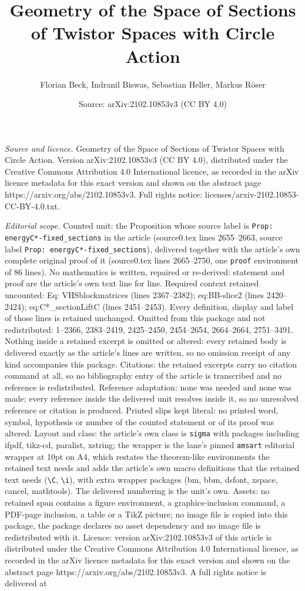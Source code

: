 \documentclass[10pt,a4paper]{amsart}
\title[Geometry of the Space of Sections of Twistor Spaces with Cir]{Geometry of the Space of Sections of Twistor Spaces with Circle Action}
\author{Florian Beck, Indranil Biswas, Sebastian Heller, Markus R\"oser}
\date{Source: arXiv:2102.10853v3 (CC BY 4.0)}
\begin{document}
\maketitle

\noindent\emph{Source and licence.} Geometry of the Space of Sections of Twistor Spaces with Circle Action. Version arXiv:2102.10853v3 (CC BY 4.0), distributed under the Creative Commons Attribution 4.0 International licence, as recorded in the arXiv licence metadata for this exact version and shown on the abstract page https://arxiv.org/abs/2102.10853v3. Full rights notice: licenses/arxiv-2102.10853-CC-BY-4.0.txt.\par\smallskip

\noindent\textit{Editorial scope.} Counted unit: the Proposition whose source label is \texttt{Prop: energyC*-fixed\_sections} in the article (source0.tex lines 2655--2663, source label \texttt{Prop: energyC*-fixed\_sections}), delivered together with the article's own complete original proof of it (source0.tex lines 2665--2750, one \texttt{proof} environment of 86 lines). No mathematics is written, repaired or re-derived: statement and proof are the article's own text line for line. Required context retained uncounted: Eq: VHSblockmatrices (lines 2367--2382); eq:BB-slice2 (lines 2420--2424); eq:C*\_sectionLiftC (lines 2451--2453). Every definition, display and label of those lines is retained unchanged. Omitted from this package and not redistributed: 1--2366, 2383--2419, 2425--2450, 2454--2654, 2664--2664, 2751--3491. Nothing inside a retained excerpt is omitted or altered: every retained body is delivered exactly as the article's lines are written, so no omission receipt of any kind accompanies this package. Citations: the retained excerpts carry no citation command at all, so no bibliography entry of the article is transcribed and no reference is redistributed. Reference adaptation: none was needed and none was made; every reference inside the delivered unit resolves inside it, so no unresolved reference or citation is produced. Printed slips kept literal: no printed word, symbol, hypothesis or number of the counted statement or of its proof was altered. Layout and class: the article's own class is \texttt{sigma} with packages including ifpdf, tikz-cd, paralist, xstring; the wrapper is the lane's pinned \texttt{amsart} editorial wrapper at 10pt on A4, which restates the theorem-like environments the retained text needs and adds the article's own macro definitions that the retained text needs (\texttt{\textbackslash C}, \texttt{\textbackslash i}), with extra wrapper packages (bm, bbm, dsfont, xspace, cancel, mathtools). The delivered numbering is the unit's own. Assets: no retained span contains a figure environment, a graphics-inclusion command, a PDF-page inclusion, a table or a TikZ picture; no image file is copied into this package, the package declares no asset dependency and no image file is redistributed with it. Licence: version arXiv:2102.10853v3 of this article is distributed under the Creative Commons Attribution 4.0 International licence, as recorded in the arXiv licence metadata for this exact version and shown on the abstract page https://arxiv.org/abs/2102.10853v3. A full rights notice is delivered at 
\end{document}
